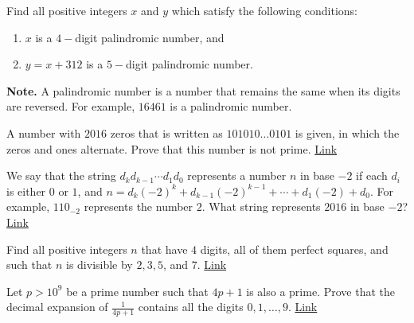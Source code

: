 \begin{problem}
	Find all positive integers $x$ and $y$ which satisfy the following conditions:
		\begin{enumerate}
			\item $x$ is a $4-$digit palindromic number, and
			\item $y=x+312$ is a $5-$digit palindromic number.
		\end{enumerate}
	\textbf{Note.} A palindromic number is a number that remains the same when its digits are reversed. For example, $16461$ is a palindromic number.
\end{problem}


\begin{problem}
	A number with $2016$ zeros that is written as $101010 \dots 0101$ is given, in which the zeros and ones alternate. Prove that this number is not prime.
	\hfill \href{https://artofproblemsolving.com/community/c6h1338112p7252140}{Link}
\end{problem}

\begin{problem}
	We say that the string $d_kd_{k-1} \cdots d_1d_0$ represents a number $n$ in base $-2$ if each $d_i$ is either $0$ or $1$, and $n = d_k(-2)^k + d_{k-1}(-2)^{k-1} + \cdots + d_1(-2) + d_0$. For example, $110_{-2}$ represents the number $2$. What string represents $2016$ in base $-2$?
	\hfill \href{https://artofproblemsolving.com/community/c126h1343610p7306481}{Link}
\end{problem}



\begin{problem}[CentroAmerican]
	Find all positive integers $n$ that have $4$ digits, all of them perfect squares, and such that $n$ is divisible by $2, 3, 5$, and $7$. \hfill \href{http://artofproblemsolving.com/community/c6h1259646p6532180}{Link}
\end{problem}



\begin{problem}
	Let $p > 10^9$ be a prime number such that $4p + 1$ is also a prime.
	Prove that the decimal expansion of $\frac{1}{4p+1}$ contains all the digits $0,1, \ldots, 9$. \hfill \href{http://artofproblemsolving.com/community/c6h1233196p6246286}{Link}
\end{problem}



